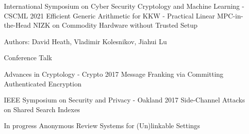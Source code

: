 


\begin{cventries}


\cventry
{International Symposium on Cyber Security Cryptology and Machine Learning - CSCML 2021} %
{Efficient Generic Arithmetic for KKW - Practical Linear MPC-in-the-Head NIZK on Commodity Hardware without Trusted Setup} %
{} %
{} %
{ %
\begin{cvitems}
\item {Authors: David Heath, Vladimir Kolesnikov, Jiahui Lu}
\item {Conference Talk}
\end{cvitems}
}


\cventry
{Advances in Cryptology - Crypto 2017} %
{Message Franking via Committing Authenticated Encryption} %
{} %
{} %
{ %
}


\cventry
{IEEE Symposium on Security and Privacy - Oakland 2017} %
{Side-Channel Attacks on Shared Search Indexes} %
{} %
{} %
{ %
}


\cventry
{In progress} %
{Anonymous Review Systems for (Un)linkable Settings} %
{}
{}
{ %
}


\end{cventries}